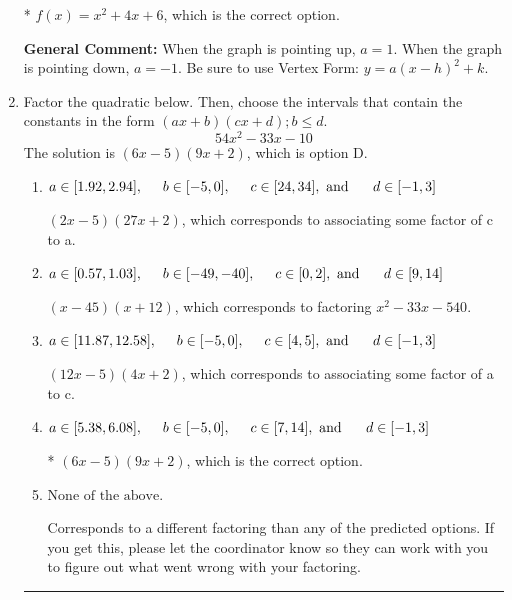 \documentclass{extbook}[14pt]
\newcommand{\litem}[1]{\item #1

\rule{\textwidth}{0.4pt}}
\begin{document}
\begin{enumerate}
{\begin{enumerate}[label=\Alph*.]
* $f(x)=x^{2} +4 x + 6$, which is the correct option.
\end{enumerate}

\textbf{General Comment:} When the graph is pointing up, $a=1$. When the graph is pointing down, $a=-1$. Be sure to use Vertex Form: $y = a(x-h)^2+k$.
}
\litem{
Factor the quadratic below. Then, choose the intervals that contain the constants in the form $(ax+b)(cx+d); b \leq d.$
\[ 54x^{2} -33 x -10 \]The solution is \( (6x -5)(9x + 2) \), which is option D.\begin{enumerate}[label=\Alph*.]
\item \( a \in [1.92, 2.94], \hspace*{5mm} b \in [-5, 0], \hspace*{5mm} c \in [24, 34], \text{ and } \hspace*{5mm} d \in [-1, 3] \)

 $(2x -5)(27x + 2)$, which corresponds to associating some factor of c to a.
\item \( a \in [0.57, 1.03], \hspace*{5mm} b \in [-49, -40], \hspace*{5mm} c \in [0, 2], \text{ and } \hspace*{5mm} d \in [9, 14] \)

 $(x -45)(x + 12)$, which corresponds to factoring $x^{2} -33 x -540$.
\item \( a \in [11.87, 12.58], \hspace*{5mm} b \in [-5, 0], \hspace*{5mm} c \in [4, 5], \text{ and } \hspace*{5mm} d \in [-1, 3] \)

 $(12x -5)(4x + 2)$, which corresponds to associating some factor of a to c.
\item \( a \in [5.38, 6.08], \hspace*{5mm} b \in [-5, 0], \hspace*{5mm} c \in [7, 14], \text{ and } \hspace*{5mm} d \in [-1, 3] \)

* $(6x -5)(9x + 2)$, which is the correct option.
\item \( \text{None of the above.} \)

 Corresponds to a different factoring than any of the predicted options. If you get this, please let the coordinator know so they can work with you to figure out what went wrong with your factoring.
\end{enumerate}

}
\end{enumerate}
\end{document}
